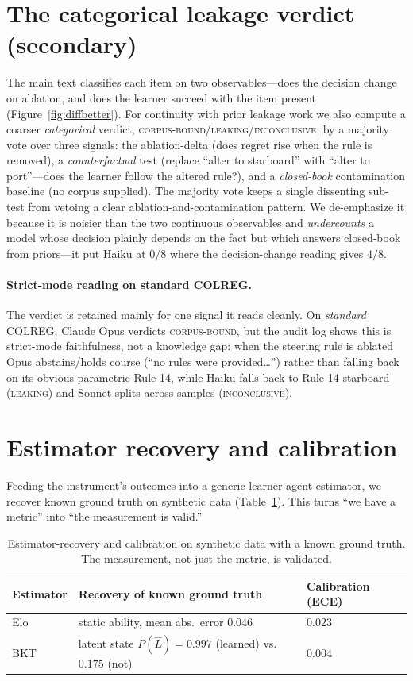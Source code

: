 \documentclass{article}
\begin{document}
\section{The categorical leakage verdict (secondary)}
\label{app:verdict}
The main text classifies each item on two observables---does the decision change on ablation, and does the
learner succeed with the item present (Figure~\ref{fig:diffbetter}). For continuity with prior leakage work
we also compute a coarser \emph{categorical} verdict, \textsc{corpus-bound}/\textsc{leaking}/\textsc{inconclusive},
by a majority vote over three signals: the ablation-delta (does regret rise when the rule is removed), a
\emph{counterfactual} test (replace ``alter to starboard'' with ``alter to port''---does the learner follow
the altered rule?), and a \emph{closed-book} contamination baseline (no corpus supplied). The majority vote
keeps a single dissenting sub-test from vetoing a clear ablation-and-contamination pattern. We de-emphasize
it because it is noisier than the two continuous observables and \emph{undercounts} a model whose decision
plainly depends on the fact but which answers closed-book from priors---it put Haiku at $0/8$ where the
decision-change reading gives $4/8$.

\paragraph{Strict-mode reading on standard COLREG.} The verdict is retained mainly for one signal it reads
cleanly. On \emph{standard} COLREG, Claude Opus verdicts \textsc{corpus-bound}, but the audit log shows this
is strict-mode faithfulness, not a knowledge gap: when the steering rule is ablated Opus abstains/holds
course (``no rules were provided\ldots'') rather than falling back on its obvious parametric Rule-14, while
Haiku falls back to Rule-14 starboard (\textsc{leaking}) and Sonnet splits across samples
(\textsc{inconclusive}).

\section{Estimator recovery and calibration}
\label{app:recovery}
Feeding the instrument's outcomes into a generic learner-agent estimator, we recover known ground truth
on synthetic data (Table~\ref{tab:recovery}). This turns ``we have a metric'' into ``the measurement is
valid.''

\begin{table}[h]
\centering
\small
\begin{tabular}{@{}lll@{}}
\toprule
Estimator & Recovery of known ground truth & Calibration (ECE) \\
\midrule
Elo & static ability, mean abs.\ error $0.046$ & $0.023$ \\
BKT & latent state $P(\hat L)=0.997$ (learned) vs.\ $0.175$ (not) & $0.004$ \\
\bottomrule
\end{tabular}
\caption{Estimator-recovery and calibration on synthetic data with a known ground truth.
The measurement, not just the metric, is validated.}
\label{tab:recovery}
\end{table}
\end{document}
